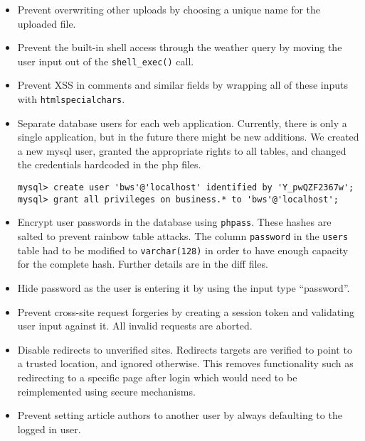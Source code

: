 \documentclass[a4paper,10pt]{article}
\begin{document}
\begin{itemize}
\item Prevent overwriting other uploads by choosing a unique name for the uploaded file.

\item Prevent the built-in shell access through the weather query by moving the user input
      out of the \lstinline|shell_exec()| call.

\item Prevent XSS in comments and similar fields by wrapping all of these inputs with \lstinline|htmlspecialchars|.

\item Separate database users for each web application. Currently, there is only a single application,
      but in the future there might be new additions. We created a new mysql user, granted the appropriate
      rights to all tables, and changed the credentials hardcoded in the php files.
      
\begin{verbatim}
mysql> create user 'bws'@'localhost' identified by 'Y_pwQZF2367w';
mysql> grant all privileges on business.* to 'bws'@'localhost';
\end{verbatim}

\item Encrypt user passwords in the database using \verb|phpass|. These hashes are salted to
      prevent rainbow table attacks. The column \verb|password| in the \verb|users| table
      had to be modified to \verb|varchar(128)| in order to have enough capacity for
      the complete hash. Further details are in the diff files.
      
\item Hide password as the user is entering it by using the input type ``password''.

\item Prevent cross-site request forgeries by creating a session token and validating
      user input against it. All invalid requests are aborted. %

\item Disable redirects to unverified sites. Redirects targets are verified to point
      to a trusted location, and ignored otherwise. This removes functionality such as redirecting
      to a specific page after login which would need to be reimplemented using secure
      mechanisms.

\item Prevent setting article authors to another user by always defaulting to the logged
      in user.

\end{itemize}
\end{document}
